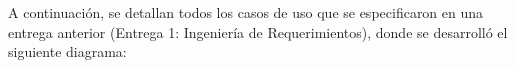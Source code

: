 \documentclass{memoria}
\begin{document}

 


A continuación, se detallan todos los casos de uso que se especificaron en una entrega anterior (Entrega 1: Ingeniería de Requerimientos), donde se desarrolló el siguiente diagrama:

\end{document}
